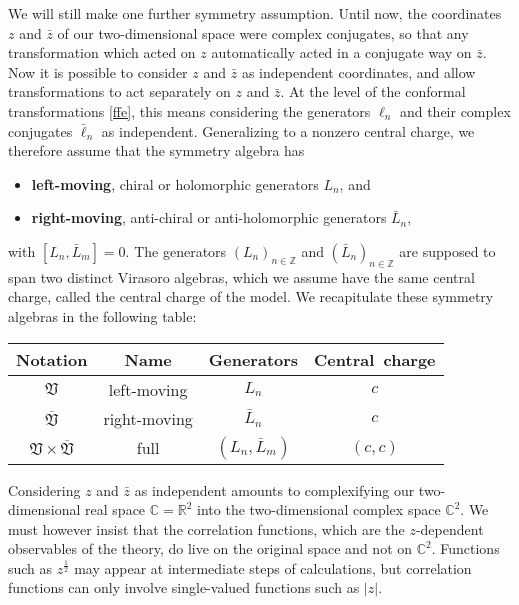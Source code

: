 \documentclass[12pt,a4paper,notitlepage]{report}
\numberwithin{equation}{section}
\theoremstyle{break}
\begin{document}
We will still make one further symmetry assumption.
Until now, the coordinates $z$ and $\bar{z}$ of our two-dimensional space were complex conjugates, so that any transformation which acted on $z$ automatically acted in a conjugate way on $\bar{z}$.
Now it is possible to consider $z$ and $\bar{z}$ as independent coordinates, and allow transformations to act separately on $z$ and $\bar{z}$.
At the level of the conformal transformations \eqref{ffe}, this means considering the generators $\ell_n$ and their complex conjugates $\bar{\ell}_n$ as independent.
Generalizing to a nonzero central charge, we therefore assume that the symmetry algebra has 
\begin{itemize}
 \item \textbf{\boldmath left-moving}, chiral or holomorphic
generators $L_n$,  and
\item  \textbf{\boldmath right-moving}, anti-chiral or anti-holomorphic generators $\bar{L}_n$,
\end{itemize}
 with
$[L_n,\bar{L}_m]=0$.
The generators $(L_n)_{n\in{\mathbb{Z}}}$ and $(\bar{L}_n)_{n\in{\mathbb{Z}}}$ are supposed to span two distinct Virasoro algebras, which we assume have the same central charge, called the central charge of the model. 
We recapitulate these symmetry algebras in the following table:
\begin{center}
\renewcommand{\arraystretch}{1.3}
 \begin{tabular}{|c|c|c|c|}
 \hline
Notation &  Name & Generators &  Central\ charge
\\
\hline\hline
 $\mathfrak{V}$ & left-moving & $L_n$ & $c$
\\
\hline
$\overline{\mathfrak{V}}$ & right-moving & $\bar{L}_n$ & $c$
\\
\hline
$\mathfrak{V}\times \overline{\mathfrak{V}}$ & full & $(L_n,\bar{L}_m)$ & $(c,c)$
\\  
\hline
 \end{tabular}
\end{center}
Considering $z$ and $\bar{z}$ as independent amounts to complexifying our two-dimensional real space ${\mathbb{C}}={\mathbb{R}}^2$ into the two-dimensional complex space ${\mathbb{C}}^2$.
We must however insist that the correlation functions, which are the $z$-dependent observables of the theory, do live on the original space and not on ${\mathbb{C}}^2$.
Functions such as $z^\frac12$ may appear at intermediate steps of calculations, but correlation functions can only involve single-valued functions such as $|z|$.
\end{document}
